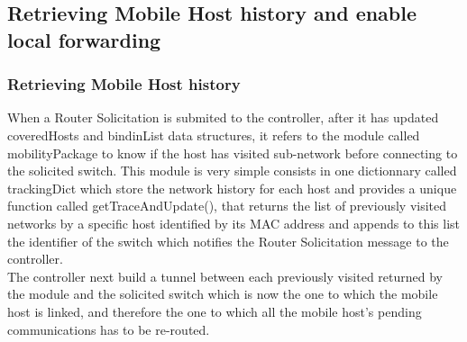 \documentclass{article}
\begin{document}
\subsection{Retrieving Mobile Host history and enable local forwarding}

\subsubsection{Retrieving Mobile Host history}
When a Router Solicitation is submited to the controller, after it has
updated coveredHosts and bindinList data structures, it refers to the
module called mobilityPackage to know if the host has visited
sub-network before connecting to the solicited switch. This module is
very simple consists in one dictionnary called trackingDict which
store the network history for each host and provides a unique function
called getTraceAndUpdate(), that returns the list of previously
visited networks by a specific host identified by its MAC address and
appends to this list the identifier of the switch which notifies the
Router Solicitation message to the controller.\\
\newline
The controller next build a tunnel between each previously visited
returned by the module and the solicited switch which is now the one
to which the mobile host is linked, and therefore the one to which
all the mobile host's pending communications has to be re-routed.
\end{document}

